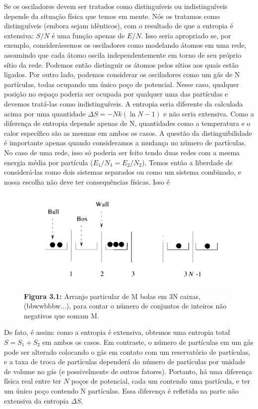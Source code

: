 \documentclass[12pt]{article}
\begin{document}
Se os osciladores devem ser tratados como distinguíveis ou indistinguíveis depende da situação física que temos em mente. Nós os tratamos como distinguíveis (embora sejam idênticos), com o resultado de que a entropia é extensiva: $S/N$ é uma função apenas de $E/N$. Isso seria apropriado se, por exemplo, considerássemos os osciladores como modelando átomos em uma rede, assumindo que cada átomo oscila independentemente em torno de seu próprio sítio da rede. Podemos então distinguir os átomos pelos sítios aos quais estão ligados. Por outro lado, podemos considerar os osciladores como um gás de N partículas, todas ocupando um único poço de potencial. Nesse caso, qualquer posição no espaço poderia ser ocupada por qualquer uma das partículas e devemos tratá-las como indistinguíveis. A entropia seria diferente da calculada acima por uma quantidade $\Delta S = -Nk(\ln N - 1)$ e não seria extensiva. Como a diferença de entropia depende apenas de N, quantidades como a temperatura e o calor específico são as mesmas em ambos os casos. A questão da distinguibilidade é importante apenas quando consideramos a mudança no número de partículas. No caso de uma rede, isso só poderia ser feito tendo duas redes com a mesma energia média por partícula ($E_1/N_1 = E_2/N_2$). Temos então a liberdade de considerá-las como dois sistemas separados ou como um sistema combinado, e nossa escolha não deve ter consequências físicas. Isso é
\begin{figure}
    \centering
    \includegraphics[width=0.5\linewidth]{image.png}
    \caption{\textbf{Figura 3.1:} Arranjo particular de M bolas em 3N caixas, (bbwwbbbw...), para contar o número de conjuntos de inteiros não negativos que somam M. }
    \label{fig:enter-label}
\end{figure}
De fato, é assim: como a entropia é extensiva, obtemos uma entropia total $S = S_1 + S_2$ em ambos os casos. Em contraste, o número de partículas em um gás pode ser alterado colocando o gás em contato com um reservatório de partículas, e a taxa de troca de partículas dependerá do número de partículas por unidade de volume no gás (e possivelmente de outros fatores). Portanto, há uma diferença física real entre ter $N$ poços de potencial, cada um contendo uma partícula, e ter um único poço contendo N partículas. Essa diferença é refletida na parte não extensiva da entropia $\Delta S$. 
 
\end{document}
